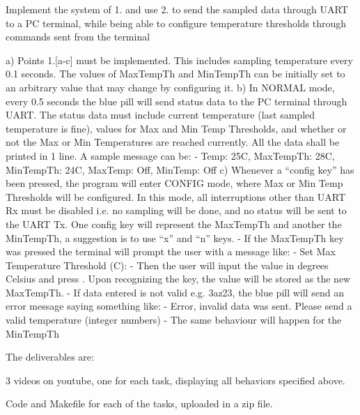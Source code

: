 \begin{DoxyEnumerate}
\item Implement the system of 1. and use 2. to send the sampled data through U\+A\+RT to a PC terminal, while being able to configure temperature thresholds through commands sent from the terminal \begin{DoxyVerb} a) Points 1.[a-c] must be implemented. This includes sampling temperature every 0.1 seconds. The values of MaxTempTh and MinTempTh can be initially set to an arbitrary value that may change by configuring it.
 b) In NORMAL mode, every 0.5 seconds the blue pill will send status data to the PC terminal through UART. The status data must include current temperature (last sampled temperature is fine), values for Max and Min Temp Thresholds, and whether or not the Max or Min Temperatures are reached currently. All the data shall be printed in 1 line. A sample message can be:
     - Temp: 25C, MaxTempTh: 28C, MinTempTh: 24C, MaxTemp: Off, MinTemp: Off
 c) Whenever a “config key” has been pressed, the program will enter CONFIG mode, where Max or Min Temp Thresholds will be configured. In this mode, all interruptions other than UART Rx must be disabled i.e. no sampling will be done, and no status will be sent to the UART Tx. One config key will represent the MaxTempTh and another the MinTempTh, a suggestion is to use “x” and “n” keys.
     - If the MaxTempTh key was pressed the terminal will prompt the user with a message like:
     - Set Max Temperature Threshold (C):
     - Then the user will input the value in degrees Celsius and press . Upon recognizing the key, the value will be stored as the new MaxTempTh.
     - If data entered is not valid e.g. 3az23, the blue pill will send an error message saying something like:
     - Error, invalid data was sent. Please send a valid temperature (integer numbers)
     - The same behaviour will happen for the MinTempTh
\end{DoxyVerb}

\end{DoxyEnumerate}

The deliverables are\+:


\begin{DoxyItemize}
\item 3 videos on youtube, one for each task, displaying all behaviors specified above.
\item Code and Makefile for each of the tasks, uploaded in a zip file. 
\end{DoxyItemize}